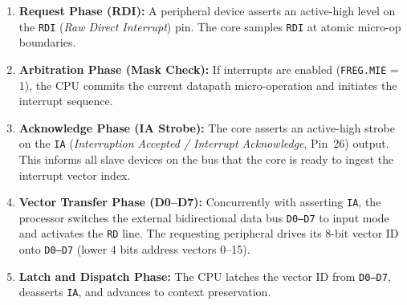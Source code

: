 \documentclass[11pt,a4paper]{article}
\newcommand{\reg}[1]{\texttt{#1}}
\begin{document}
\begin{enumerate}
  \item \textbf{Request Phase (RDI):} A peripheral device asserts an active-high level on the \texttt{RDI} (\textit{Raw Direct Interrupt}) pin. The core samples \texttt{RDI} at atomic micro-op boundaries.
  \item \textbf{Arbitration Phase (Mask Check):} If interrupts are enabled (\reg{FREG.MIE} = 1), the CPU commits the current datapath micro-operation and initiates the interrupt sequence.
  \item \textbf{Acknowledge Phase (IA Strobe):} The core asserts an active-high strobe on the \texttt{IA} (\textit{Interruption Accepted / Interrupt Acknowledge}, Pin~26) output. This informs all slave devices on the bus that the core is ready to ingest the interrupt vector index.
  \item \textbf{Vector Transfer Phase (D0--D7):} Concurrently with asserting \texttt{IA}, the processor switches the external bidirectional data bus \texttt{D0--D7} to input mode and activates the \texttt{RD} line. The requesting peripheral drives its 8-bit vector ID onto \texttt{D0--D7} (lower 4 bits address vectors 0--15).
  \item \textbf{Latch and Dispatch Phase:} The CPU latches the vector ID from \texttt{D0--D7}, deasserts \texttt{IA}, and advances to context preservation.
\end{enumerate}
\end{document}
